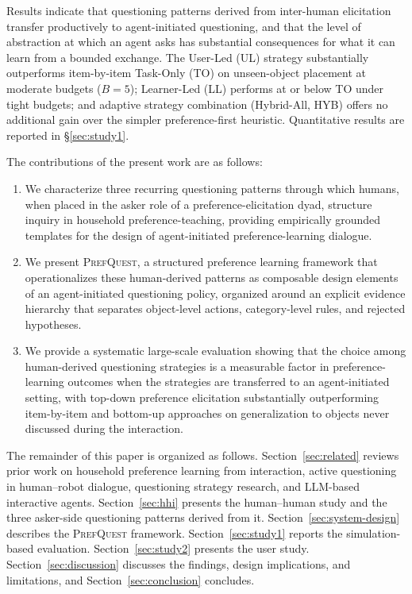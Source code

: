 \documentclass[manuscript,review,anonymous]{acmart}
\begin{document}
Results indicate that questioning patterns derived from inter-human elicitation transfer productively to agent-initiated questioning, and that the level of abstraction at which an agent asks has substantial consequences for what it can learn from a bounded exchange. The User-Led (UL) strategy substantially outperforms item-by-item Task-Only (TO) on unseen-object placement at moderate budgets ($B = 5$); Learner-Led (LL) performs at or below TO under tight budgets; and adaptive strategy combination (Hybrid-All, HYB) offers no additional gain over the simpler preference-first heuristic. Quantitative results are reported in §\ref{sec:study1}.

The contributions of the present work are as follows:
\begin{enumerate}
  \item We characterize three recurring questioning patterns through which humans, when placed in the asker role of a preference-elicitation dyad, structure inquiry in household preference-teaching, providing empirically grounded templates for the design of agent-initiated preference-learning dialogue.
  \item We present \textsc{PrefQuest}, a structured preference learning framework that operationalizes these human-derived patterns as composable design elements of an agent-initiated questioning policy, organized around an explicit evidence hierarchy that separates object-level actions, category-level rules, and rejected hypotheses.
  \item We provide a systematic large-scale evaluation showing that the choice among human-derived questioning strategies is a measurable factor in preference-learning outcomes when the strategies are transferred to an agent-initiated setting, with top-down preference elicitation substantially outperforming item-by-item and bottom-up approaches on generalization to objects never discussed during the interaction.
\end{enumerate}

The remainder of this paper is organized as follows. Section~\ref{sec:related} reviews prior work on household preference learning from interaction, active questioning in human--robot dialogue, questioning strategy research, and LLM-based interactive agents. Section~\ref{sec:hhi} presents the human--human study and the three asker-side questioning patterns derived from it. Section~\ref{sec:system-design} describes the \textsc{PrefQuest} framework. Section~\ref{sec:study1} reports the simulation-based evaluation. Section~\ref{sec:study2} presents the user study. Section~\ref{sec:discussion} discusses the findings, design implications, and limitations, and Section~\ref{sec:conclusion} concludes.
\end{document}
